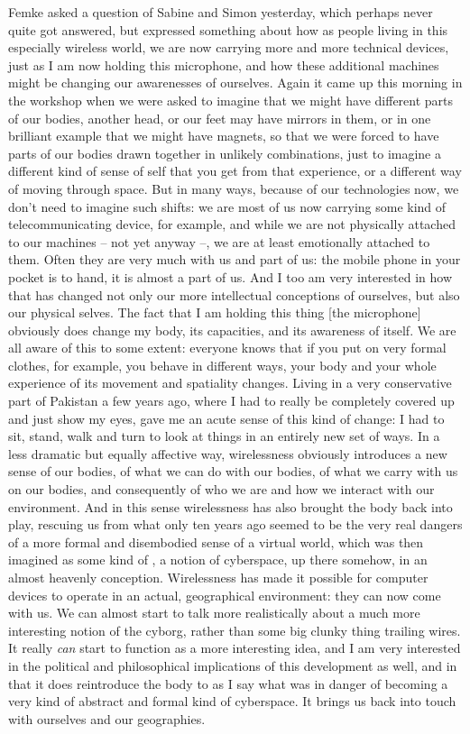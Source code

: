 {Femke asked a question of Sabine and Simon yesterday, which perhaps
never quite got answered, but expressed something about how as people
living in this especially wireless world, we are now carrying more and
more technical devices, just as I am now holding this microphone, and
how these additional machines might be changing our awarenesses of
ourselves. Again it came up this morning in the workshop when we were
asked to imagine that we might have different parts of our bodies,
another head, or our feet may have mirrors in them, or in one brilliant
example that we might have magnets, so that we were forced to have
parts of our bodies drawn together in unlikely combinations, just to
imagine a different kind of sense of self that you get from that
experience, or a different way of moving through space. But in many
ways, because of our technologies now, we don't need to imagine such
shifts: we are most of us now carrying some kind of telecommunicating
device, for example, and while we are not physically attached to our
machines {--} not yet anyway {--}, we are at least emotionally attached
to them. Often they are very much with us and part of us: the mobile
phone in your pocket is to hand, it is almost a part of us. And I too
am very interested in how that has changed not only our more
intellectual conceptions of ourselves, but also our physical selves.
The fact that I am holding this thing [the microphone] obviously does
change my body, its capacities, and its awareness of itself. We are all
aware of this to some extent: everyone knows that if you put on very
formal clothes, for example, you behave in different ways, your body
and your whole experience of its movement and spatiality changes.
Living in a very conservative part of Pakistan a few years ago, where I
had to really be completely covered up and just show my eyes, gave me
an acute sense of this kind of change: I had to sit, stand, walk and
turn to look at things in an entirely new set of ways. In a less
dramatic but equally affective way, wirelessness obviously introduces a
new sense of our bodies, of what we can do with our bodies, of what we
carry with us on our bodies, and consequently of who we are and how we
interact with our environment. And in this sense wirelessness has also
brought the body back into play, rescuing us from what only ten years
ago seemed to be the very real dangers of a more formal and disembodied
sense of a virtual world, which was then imagined as some kind of
, a notion of cyberspace, up there somehow, in an almost
heavenly conception. Wirelessness has made it possible for computer
devices to operate in an actual, geographical environment: they can now
come with us. We can almost start to talk more realistically about a
much more interesting notion of the cyborg, rather than some big clunky
thing trailing wires. It really {\em can} start to function as a
more interesting idea, and I am very interested in the political and
philosophical implications of this development as well, and in that it
does reintroduce the body to as I say what was in danger of becoming a
very kind of abstract and formal kind of cyberspace. It brings us back
into touch with ourselves and our geographies. 

}
